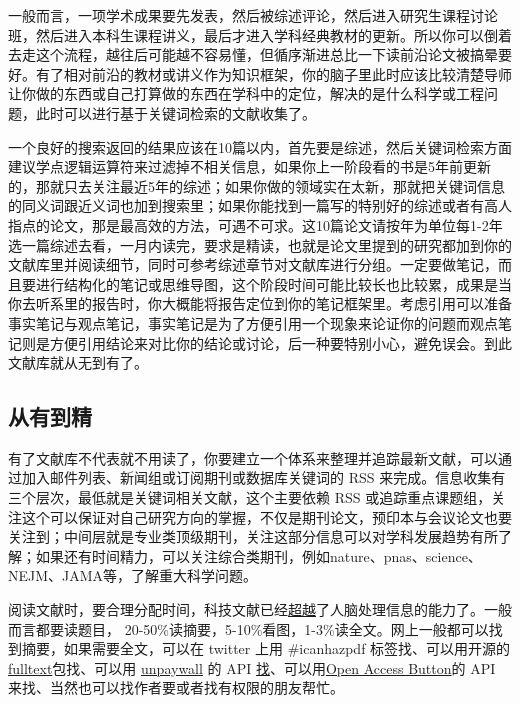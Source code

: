 \documentclass[]{tufte-book}
\begin{document}
一般而言，一项学术成果要先发表，然后被综述评论，然后进入研究生课程讨论班，然后进入本科生课程讲义，最后才进入学科经典教材的更新。所以你可以倒着去走这个流程，越往后可能越不容易懂，但循序渐进总比一下读前沿论文被搞晕要好。有了相对前沿的教材或讲义作为知识框架，你的脑子里此时应该比较清楚导师让你做的东西或自己打算做的东西在学科中的定位，解决的是什么科学或工程问题，此时可以进行基于关键词检索的文献收集了。

一个良好的搜索返回的结果应该在10篇以内，首先要是综述，然后关键词检索方面建议学点逻辑运算符来过滤掉不相关信息，如果你上一阶段看的书是5年前更新的，那就只去关注最近5年的综述；如果你做的领域实在太新，那就把关键词信息的同义词跟近义词也加到搜索里；如果你能找到一篇写的特别好的综述或者有高人指点的论文，那是最高效的方法，可遇不可求。这10篇论文请按年为单位每1-2年选一篇综述去看，一月内读完，要求是精读，也就是论文里提到的研究都加到你的文献库里并阅读细节，同时可参考综述章节对文献库进行分组。一定要做笔记，而且要进行结构化的笔记或思维导图，这个阶段时间可能比较长也比较累，成果是当你去听系里的报告时，你大概能将报告定位到你的笔记框架里。考虑引用可以准备事实笔记与观点笔记，事实笔记是为了方便引用一个现象来论证你的问题而观点笔记则是方便引用结论来对比你的结论或讨论，后一种要特别小心，避免误会。到此文献库就从无到有了。

\hypertarget{ux4eceux6709ux5230ux7cbe}{%
\subsection{从有到精}\label{ux4eceux6709ux5230ux7cbe}}

有了文献库不代表就不用读了，你要建立一个体系来整理并追踪最新文献，可以通过加入邮件列表、新闻组或订阅期刊或数据库关键词的 RSS 来完成。信息收集有三个层次，最低就是关键词相关文献，这个主要依赖 RSS 或追踪重点课题组，关注这个可以保证对自己研究方向的掌握，不仅是期刊论文，预印本与会议论文也要关注到；中间层就是专业类顶级期刊，关注这部分信息可以对学科发展趋势有所了解；如果还有时间精力，可以关注综合类期刊，例如nature、pnas、science、NEJM、JAMA等，了解重大科学问题。

阅读文献时，要合理分配时间，科技文献已经\href{https://www.alternet.org/news-amp-politics/science-has-outgrown-human-mind-and-its-limited-capacities-process-information}{超越}了人脑处理信息的能力了。一般而言都要读题目， 20-50\%读摘要，5-10\%看图，1-3\%读全文。网上一般都可以找到摘要，如果需要全文，可以在 twitter 上用 \#icanhazpdf 标签找、可以用开源的\href{https://github.com/ropensci/fulltext}{fulltext}包找、可以用 \href{https://unpaywall.org/}{unpaywall} 的 API \href{https://cran.r-project.org/web/packages/roadoi/vignettes/intro.html}{找}、可以用\href{https://openaccessbutton.org/}{Open Access Button}的 API 来找、当然也可以找作者要或者找有权限的朋友帮忙。
\end{document}
